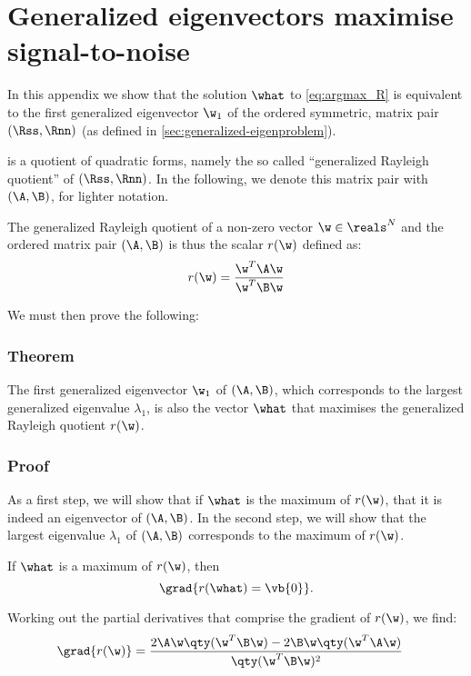 \chapter{Generalized eigenvectors maximise signal-to-noise}
\label{apx:GEvecs-maximise-SNR}

In this appendix we show that the solution $\what$ to \cref{eq:argmax_R} is equivalent to the first generalized eigenvector $\w_1$ of the ordered symmetric, matrix pair $(\Rss, \Rnn)$ (as defined in \cref{sec:generalized-eigenproblem}).

 is a quotient of quadratic forms, namely the so called ``generalized Rayleigh quotient'' of $(\Rss, \Rnn)$. In the following, we denote this matrix pair with $(\A,\B)$, for lighter notation.

The generalized Rayleigh quotient of a non-zero vector $\w \in \reals^N$ and the ordered matrix pair $(\A,\B)$ is thus the scalar $r(\w)$ defined as:
%
\begin{equation}
\label{eq:Rayleigh}
r(\w) = \frac{\w^T \A \w}
             {\w^T \B \w}
\end{equation}

We must then prove the following:



\subsection{Theorem}

The first generalized eigenvector $\w_1$ of $(\A,\B)$, which corresponds to the largest generalized eigenvalue $\lambda_1$, is also the vector $\what$ that maximises the generalized Rayleigh quotient $r(\w)$.




\subsection{Proof}

As a first step, we will show that if $\what$ is the maximum of $r(\w)$, that it is indeed an eigenvector of $(\A,\B)$. In the second step, we will show that the largest eigenvalue $\lambda_1$ of $(\A,\B)$ corresponds to the maximum of $r(\w)$.

If $\what$ is a maximum of $r(\w)$, then
\begin{equation}
\label{eq:critical}
\grad{r(\what) = \vb{0}}.
\end{equation}

Working out the partial derivatives that comprise the gradient of $r(\w)$, we find:
\begin{align*}
\grad{r(\w)} &= \frac{2 \A \w \qty(\w^T \B \w) 
                      - 2 \B \w \qty(\w^T \A \w)}
                     {\qty(\w^T \B \w)^2}
\end{align*}

